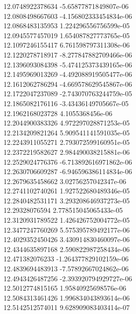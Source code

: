 {12.0748922378634 -5.65877871849807e-06
 \\
12.0808498667603 -4.156802333454834e-06
 \\
12.0868483135953 1.224296556756599e-05
 \\
12.0945577457019 1.654087827773765e-05
 \\
12.1097246155417 6.761598797311308e-06
 \\
12.1220278718917 -8.277847882709466e-06
 \\
12.1396093084398 -5.474125373439165e-06
 \\
12.1495969013269 -4.492088919505477e-06
 \\
12.1612062786294 -4.669578629545867e-06
 \\
12.1722047237089 -2.743070763244759e-05
 \\
12.1865082176116 -3.43436149705667e-05
 \\
12.1962168023728 4.1055368456e-06
 \\
12.2044900383326 4.972297028871253e-05
 \\
12.2134209821264 5.909541141591035e-05
 \\
12.2243911055271 2.793072599160951e-05
 \\
12.2372219582627 2.984490038215881e-06
 \\
12.2529024776376 -6.713892616971862e-06
 \\
12.2630706609287 -6.946596386114834e-06
 \\
12.2679635458662 3.02756257042347e-06
 \\
12.2741102740261 1.927522680489346e-05
 \\
12.2840482531171 3.293208646937273e-05
 \\
12.29328076594 2.778515045065433e-05
 \\
12.3120931789522 1.426426752004772e-05
 \\
12.3477247760269 5.575395789492177e-06
 \\
12.4029352450426 3.430914830460097e-06
 \\
12.4344635897168 2.590822987258434e-06
 \\
12.471382076233 -1.264377829102159e-06
 \\
12.4839694483913 -7.57892667024862e-06
 \\
12.4943426487256 -2.393920794929727e-06
 \\
12.5012774815165 1.95840925698576e-06
 \\
12.5084313461426 1.996834043893614e-06
 \\
12.5142512574011 9.628909083403414e-07
}
